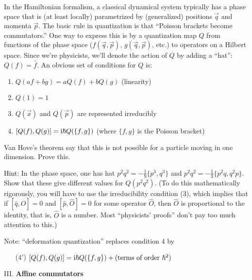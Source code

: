 In the Hamiltonian formalism, a classical dynamical system typically has
a phase space that is (at least locally) parametrized by (generalized)
positions $\vec{q}$ and momenta $\vec{p}$. The basic rule in
quantization is that ``Poisson brackets become commutators.'' One way to
express this is by a quantization map $Q$ from functions of the phase
space ($f(\vec{q},\vec{p})$, $g(\vec{q},\vec{p})$, etc.) to operators on
a Hilbert space. Since we're physicists, we'll denote the action of $Q$
by adding a ``hat'': $Q(f)=\widehat{f}$. An obvious set of conditions
for $Q$ is:
\begin{enumerate}[nosep,label=(\arabic*)]
\item $Q(af+bg)=aQ(f)+bQ(g)$ (linearity)
\item $Q(1)=1$
\item $Q(\vec{x})$ and $Q(\vec{p})$ are represented irreducibly
\item $[Q(f),Q(g)]=\mathrm{i}\hbar Q(\{f,g\})$ (where $\{f,g\}$ is the Poisson bracket)
\end{enumerate}

Van Hove's theorem say that this is not possible for a particle moving
in one dimension. Prove this.

Hint: In the phase space, one has hat $p^{2}q^{2} = -\frac{1}{9}\{p^{3},q^{3}\}$
and $p^{2}q^{2} = -\frac{1}{3}\{p^{2}q,q^{2}p\}$. Show that these give
different values for $Q(p^{2}q^{2})$. (To do this mathematically
rigorously, you will have to use the irreducibility condition (3), which
implies that if $[\widehat{q},\widehat{O}]=0$ and
$[\widehat{p},\widehat{O}]=0$ for some operator $\widehat{O}$, then
$\widehat{O}$ is proportional to the identity, that is, $\widehat{O}$ is
a number. Most ``physicists' proofs'' don't pay too much attention to
this.)

Note: ``deformation quantization'' replaces condition 4 by
\begin{itemize}
\item[($4'$)] $[Q(f),Q(g)]=\mathrm{i}\hbar Q(\{f,g\}) + (\mbox{terms of order }\hbar^{2})$
\end{itemize}


\medbreak\noindent{}III. \textbf{Affine commutators}\medbreak

